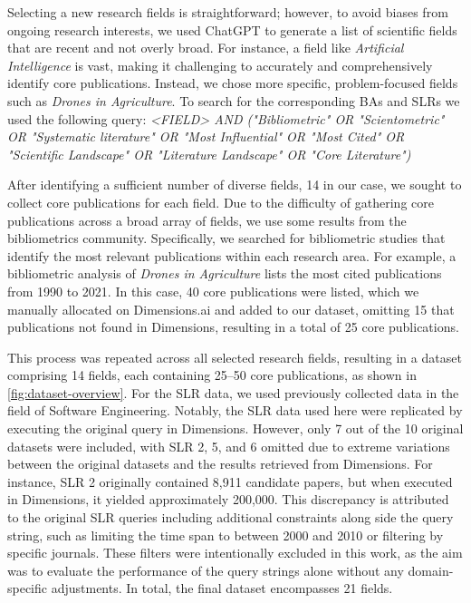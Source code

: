 Selecting a new research fields is straightforward; however, to avoid biases from ongoing research interests, we used ChatGPT to generate a list of scientific fields that are recent and not overly broad. For instance, a field like \textit{Artificial Intelligence} is vast, making it challenging to accurately and comprehensively identify core publications. Instead, we chose more specific, problem-focused fields such as \textit{Drones in Agriculture}. To search for the corresponding BAs and SLRs we used the following query: \textit{<FIELD> AND ("Bibliometric" OR "Scientometric" OR "Systematic literature" OR "Most Influential" OR "Most Cited" OR "Scientific Landscape" OR "Literature Landscape" OR "Core Literature")} 


After identifying a sufficient number of diverse fields, 14 in our case, we sought to collect core publications for each field. Due to the difficulty of gathering core publications across a broad array of fields, we use some results  from the bibliometrics community. Specifically, we searched for bibliometric studies that identify the most relevant publications within each research area. For example, a bibliometric analysis of \textit{Drones in Agriculture} \autocite{Rejeb2022} lists the most cited publications from 1990 to 2021. In this case, 40 core publications were listed, which we manually allocated on Dimensions.ai and added to our dataset, omitting 15 that publications not found in Dimensions, resulting in a total of 25 core publications.

This process was repeated across all selected research fields, resulting in a dataset comprising 14 fields, each containing 25–50 core publications, as shown in \autoref{fig:dataset-overview}. For the SLR data, we used previously collected data \autocite{badami2023adaptive} in the field of Software Engineering. Notably, the SLR data used here were replicated by executing the original query in Dimensions. However, only 7 out of the 10 original datasets were included, with SLR 2, 5, and 6 omitted due to extreme variations between the original datasets and the results retrieved from Dimensions. For instance, SLR 2 originally contained 8,911 candidate papers, but when executed in Dimensions, it yielded approximately 200,000. This discrepancy is attributed to the original SLR queries including additional constraints along side the query string, such as limiting the time span to between 2000 and 2010 or filtering by specific journals. These filters were intentionally excluded in this work, as the aim was to evaluate the performance of the query strings alone without any domain-specific adjustments. In total, the final dataset encompasses 21 fields.

